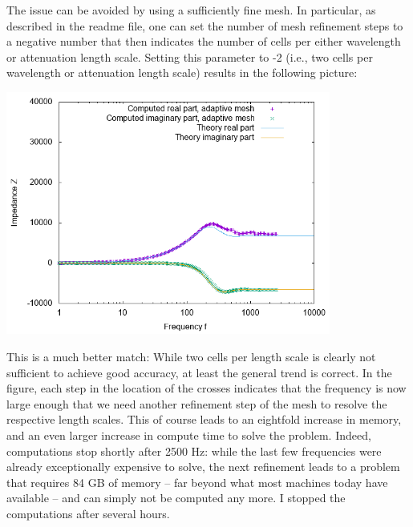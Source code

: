 \documentclass{article}
\begin{document}
The issue can be avoided by using a sufficiently fine mesh. In
particular, as described in the readme file, one can set the number of
mesh refinement steps to a negative number that then indicates the
number of cells per either wavelength or attenuation length
scale. Setting this parameter to -2 (i.e., two cells per wavelength or
attenuation length scale) results in the following picture:
\begin{center}
\includegraphics[width=0.8\textwidth]{wave-guide-tet-real-material-jasons-mesh-high-attenuation-adaptive/impedance.png}
\end{center}
This is a much better match: While two cells per length scale is
clearly not sufficient to achieve good accuracy, at least the general
trend is correct. In the figure, each step in the location of the
crosses indicates that the frequency is now large enough that we need
another refinement step of the mesh to resolve the respective length
scales. This of course leads to an eightfold increase in memory, and
an even larger increase in compute time to solve the problem. Indeed,
computations stop shortly after 2500 Hz: while the last few
frequencies were already exceptionally expensive to solve, the next
refinement leads to a problem that requires 84 GB of memory -- far
beyond what most machines today have available -- and can simply not
be computed any more. I stopped the computations after several hours.
\end{document}
